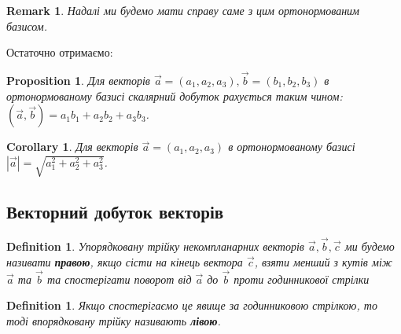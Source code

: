 \documentclass[a4paper, 10pt]{extarticle}
\theoremstyle{theoremdd}
\theoremstyle{theoremdd}
\newtheorem{definition}[theorem]{Definition}
\theoremstyle{theoremdd}
\theoremstyle{theoremdd}
\theoremstyle{theoremdd}
\newtheorem{proposition}[theorem]{Proposition}
\theoremstyle{theoremdd}
\newtheorem{remark}[theorem]{Remark}
\theoremstyle{theoremdd}
\theoremstyle{theoremdd}
\newtheorem{corollary}[theorem]{Corollary}
\begin{document}
\begin{remark}
	Надалі ми будемо мати справу саме з цим ортонормованим базисом.
\end{remark}

	Остаточно отримаємо:
\begin{proposition}
	Для векторів $\vec{a} = (a_1, a_2, a_3), \vec{b} = (b_1, b_2, b_3)$ в ортонормованому базисі скалярний добуток рахується таким чином:\\
	$(\vec{a}, \vec{b}) = a_1 b_1 + a_2 b_2 + a_3 b_3$.
\end{proposition}

\begin{corollary}
	Для векторів $\vec{a} = (a_1, a_2, a_3)$ в ортонормованому базисі\\
	$|\vec{a}| = \sqrt{a_1^2 + a_2^2 + a_3^2}$.
\end{corollary}

\subsection{Векторний добуток векторів}
\begin{definition}
	Упорядковану трійку некомпланарних векторів $\vec{a}, \vec{b}, \vec{c}$ ми будемо називати \textbf{правою}, якщо сісти на кінець вектора $\vec{c}$, взяти менший з кутів між $\vec{a}$ та $\vec{b}$ та спостерігати поворот від $\vec{a}$ до $\vec{b}$ \textit{проти годинникової} стрілки

\begin{figure}[H]
\centering
{}
\end{figure}
\end{definition}

\begin{definition}
	Якщо спостерігаємо це явище \textit{за годинниковою} стрілкою, то тоді впорядковану трійку називають \textbf{лівою}.
\begin{figure}[H]
\centering
{}
\end{figure}
\end{definition}
\end{document}
